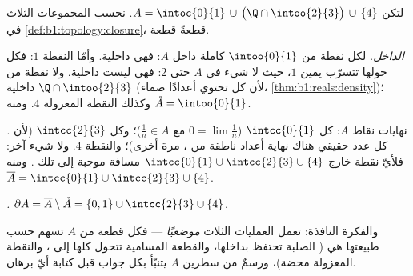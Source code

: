 \begin{example}\label{ex:b1:topology:anatomy}
لتكن $A = \intoc{0}{1} \,\cup\, \bigl(\Q \cap \intoo{2}{3}\bigr)
\,\cup\, \{4\}$. نحسب المجموعات الثلاث في
\cref{def:b1:topology:closure}، قطعةً قطعة.

\emph{الداخل.} لكل نقطة من $\intoo{0}{1}$  كاملة
داخل $A$: فهي داخلية. وأمّا النقطة $1$: فكل  حولها
تتسرّب يمين $1$، حيث لا شيء في $A$ حتى $2$: فهي ليست
داخلية. ولا نقطة من $\Q \cap \intoo{2}{3}$ داخلية (لأن كل
 تحتوي أعدادًا صماء، \cref{thm:b1:reals:density})؛
وكذلك النقطة المعزولة $4$. ومنه $\mathring A = \intoo{0}{1}$.

\emph{.} نهايات نقاط $A$: كل $\intcc{0}{1}$
($0 = \lim \frac1n$ مع $\frac 1n \in A$)؛ وكل
$\intcc{2}{3}$ (لأن كل عدد حقيقي هناك نهاية أعداد ناطقة من
،  مرة أخرى)؛ والنقطة $4$. ولا شيء آخر: فلأيّ نقطة
خارج $\intcc{0}{1} \cup \intcc{2}{3} \cup \{4\}$ مسافة موجبة
إلى تلك . ومنه $\overline A = \intcc{0}{1} \cup
\intcc{2}{3} \cup \{4\}$.

\emph{.} $\partial A = \overline A \setminus \mathring A
= \{0, 1\} \cup \intcc{2}{3} \cup \{4\}$.

والفكرة النافذة: تعمل العمليات الثلاث \emph{موضعيًا} ---
فكل قطعة من $A$ تسهم حسب طبيعتها هي (
الصلبة تحتفظ بداخلها، والقطعة  المسامية تتحول
كلها إلى ، والنقطة المعزولة  محضة)،
ورسمٌ من سطرين  $A$ يتنبّأ بكل جواب قبل كتابة أيّ
برهان.
\end{example}

